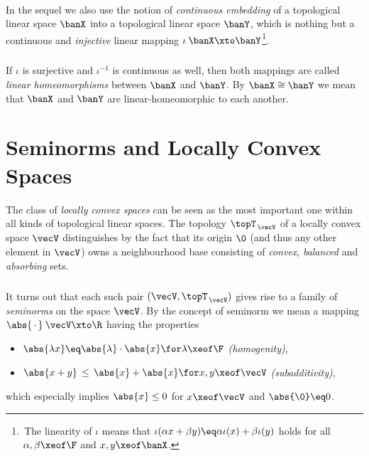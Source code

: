 \documentclass[11pt,twoside]{article}
\begin{document}
\paragraph{} %
In the sequel we also use the notion of \textit{continuous embedding}
of a topological linear space $\banX$ into a topological linear space $\banY$,
which is nothing but a continuous and \textit{injective} linear mapping
$\iota\:\banX \xto \banY$\footnote{
\,The linearity of $\iota$ means that
$\iota(\alpha x + \beta y) \eq \alpha \iota(x) + \beta \iota(y)$ holds
for all $\alpha, \beta \xeof \F$ and $x,y \xeof \banX$.}.

\subparagraph{} %
If $\iota$ is surjective and $\iota^{-1}$ is continuous as well,
then both mappings are called \textit{linear homeomorphisms}
between $\banX$ and $\banY$.
By $\banX \cong \banY$ we mean
that $\banX$ and $\banY$ are linear-homeomorphic to each another.

\section{Seminorms and Locally Convex Spaces}
The class of \textit{locally convex spaces} can be seen as the most important
one within all kinds of topological linear spaces.
The topology $\topT_{\,\vecV}$ of a locally convex space $\vecV$ distinguishes
by the fact
that its origin $\0$
(and thus any other element in $\vecV$) owns a neighbourhood base
consisting of \textit{convex}, \textit{balanced} and \textit{absorbing} sets.

\subparagraph{} %
It turns out
that each such pair $(\vecV,\topT_{\,\vecV})$ gives rise to
a family of \textit{seminorms} on the space $\vecV$.
By the concept of seminorm
we mean a mapping $\abs{\,\cdot\,} \:\vecV \xto \R$ having the properties

\begin{itemize}[leftmargin=55pt,itemsep=2pt]
\item[(SN-1)] \quad
$\abs{\lambda x} \eq \abs{\lambda} \cdot \abs{x} \for \lambda \xeof \F$
\textit{(homogenity)},
\item[(SN-2)] \quad
$\abs{x+y} \, \leq \, \abs{x} + \abs{x} \for x,y \xeof \vecV$
\textit{(subadditivity)},
\end{itemize}

which especially implies $\abs{x} \leq 0$ for $x \xeof \vecV$
and $\abs{\0} \eq 0$.
\end{document}

